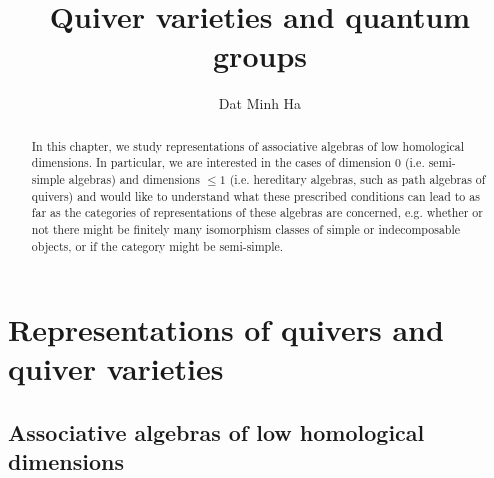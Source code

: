 

\setcounter{chapter}{-1}
\setcounter{section}{-1}





	\title{Quiver varieties and quantum groups}
	
	\author{Dat Minh Ha}
	\maketitle
	
	\begin{abstract}
	    
	\end{abstract}
	
	{
      \hypersetup{} 
      \dominitoc
      \tableofcontents %
    }
    
    
    
    \part{Representations of quivers and quiver varieties}
        \chapter{Associative algebras of low homological dimensions}
            \begin{abstract}
                In this chapter, we study representations of associative algebras of low homological dimensions. In particular, we are interested in the cases of dimension $0$ (i.e. semi-simple algebras) and dimensions $\leq 1$ (i.e. hereditary algebras, such as path algebras of quivers) and would like to understand what these prescribed conditions can lead to as far as the categories of representations of these algebras are concerned, e.g. whether or not there might be finitely many isomorphism classes of simple or indecomposable objects, or if the category might be semi-simple. 
            \end{abstract}
            
            \minitoc
            
            
            
            
            
            
            
